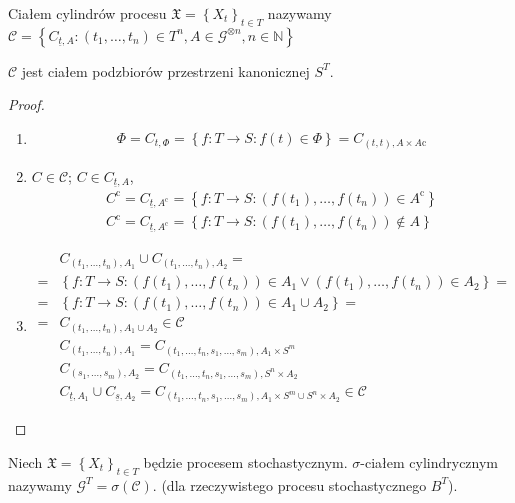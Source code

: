 \begin{defi}
Ciałem cylindrów procesu $ \mathfrak X=\left\{X_t\right\}_{t\in T} $ nazywamy\\$ \mathcal C=\left\{C_{\underline t,A}:\left(t_1,\dots,t_n\right)\in T^n,A\in \mathcal G^{\otimes n},n\in \mathbb N \right\} $
\end{defi}
\begin{twr}
$ \mathcal C $ jest ciałem podzbiorów przestrzeni kanonicznej $ S^T $.
\begin{proof}
\begin{enumerate}
\item 
\begin{gather*}
\Phi=C_{t,\Phi}=\left\{f:T\to S:f(t)\in \Phi \right\}=C_{(t,t),A\times A\mathrm c}
\end{gather*}
\item $ C\in\mathcal C $; $ C\in C_{\underline t,A} $,
\begin{gather*}
C^\mathrm c=C_{\underline t,A^\mathrm c}=\left\{f:T\to S:\left(f(t_1),\dots,f(t_n)\right)\in A^\mathrm c\right\}\\
C^\mathrm c=C_{\underline t,A^\mathrm c}=\left\{f:T\to S:\left(f(t_1),\dots,f(t_n)\right)\notin A\right\}
\end{gather*}
\item 
\begin{align*}
&
C_{\left(t_1,\dots,t_n\right),A_1}\cup C_{\left(t_1,\dots,t_n\right),A_2}
=\\=&
\left\{f:T\to S:\left(f(t_1),\dots,f(t_n)\right)\in A_1\vee\left(f(t_1),\dots,f(t_n)\right)\in A_2\right\}
=\\=&
\left\{f:T\to S:\left(f(t_1),\dots,f(t_n)\right)\in A_1\cup A_2\right\}
=\\=&
C_{\left(t_1,\dots,t_n\right),A_1\cup A_2}\in\mathcal C\\
&
C_{\left(t_1,\dots,t_n\right),A_1}=
C_{\left(t_1,\dots,t_n,s_1,\dots,s_m\right),A_1\times S^m}\\
&C_{\left(s_1,\dots,s_m\right),A_2}=
C_{\left(t_1,\dots,t_n,s_1,\dots,s_m\right),S^n\times A_2}\\
&C_{\underline t,A_1}\cup C_{\underline s,A_2}=
C_{\left(t_1,\dots,t_n,s_1,\dots,s_m\right),A_1\times S^m\cup S^n\times A_2}\in \mathcal C
\end{align*}
\end{enumerate}
\end{proof}
\end{twr}
\begin{defi}
Niech $ \mathfrak X=\left\{X_t\right\} _{t\in T}$ będzie procesem stochastycznym. $ \sigma $-ciałem cylindrycznym nazywamy $ \mathcal G^T=\sigma(\mathcal C). $ (dla rzeczywistego procesu stochastycznego $ B^T $).
\end{defi}
